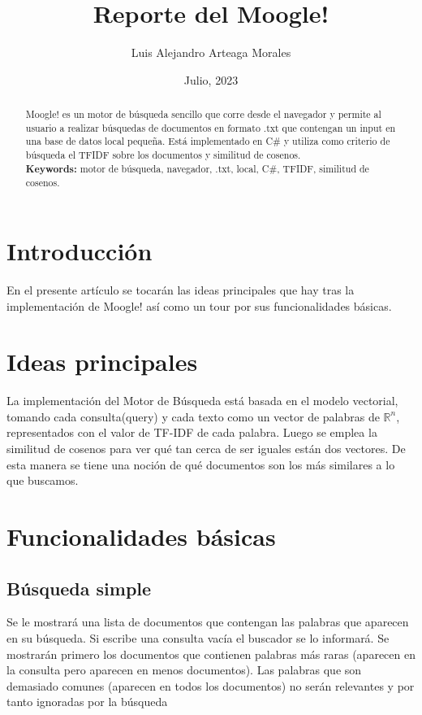 \documentclass[a4paper,12pt]{article}
\begin{document}
\title{Reporte del Moogle!}
\author{Luis Alejandro Arteaga Morales}
\date{Julio, 2023}
\maketitle

\begin{abstract}
    Moogle! es un motor de búsqueda sencillo que corre desde el navegador y permite al usuario a realizar búsquedas de documentos en formato .txt que contengan un input en una base de datos local pequeña.
    Está implementado en C\# y utiliza como criterio de búsqueda el TFIDF sobre los documentos y similitud de cosenos.
    \\
    \newline
    {\bf Keywords:} motor de búsqueda, navegador, .txt, local, C\#, TFIDF, similitud de cosenos.
\end{abstract}


\section{Introducción}\label{sec:intro}

En el presente artículo se tocarán las ideas principales que hay tras la implementación de Moogle! así como un tour por sus funcionalidades básicas.

\section{Ideas principales}\label{sec:core-ideas}

La implementación del Motor de Búsqueda está basada en el modelo vectorial, tomando cada consulta(query) y 
cada texto como un vector de palabras de $\mathbb{R}^{n}$, representados con el valor
de TF-IDF de cada palabra. Luego se emplea la similitud de cosenos para ver qué tan cerca de
ser iguales están dos vectores. De esta manera se tiene una noción de qué documentos son los
más similares a lo que buscamos.

\section{Funcionalidades básicas}\label{sec:funct}

\subsection{Búsqueda simple}\label{sub:simplesearch}
Se le mostrará una lista de documentos que contengan las palabras que aparecen en su búsqueda. Si escribe 
una consulta vacía el buscador se lo informará. Se mostrarán primero los documentos que contienen palabras 
más raras (aparecen en la consulta pero aparecen en menos documentos). Las palabras que son demasiado comunes
(aparecen en todos los documentos) no serán relevantes y por tanto ignoradas por la búsqueda
\end{document}
